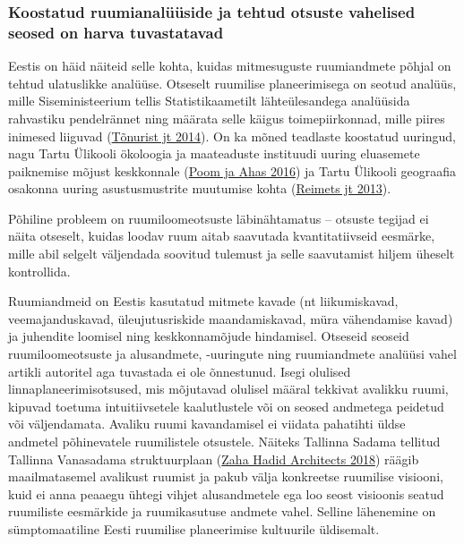 \documentclass[estonian,]{article}
\begin{document}
\hypertarget{koostatud-ruumianaluxfcuxfcside-ja-tehtud-otsuste-vahelised-seosed-on-harva-tuvastatavad}{%
\subsubsection*{Koostatud ruumianalüüside ja tehtud otsuste vahelised seosed on harva tuvastatavad}\label{koostatud-ruumianaluxfcuxfcside-ja-tehtud-otsuste-vahelised-seosed-on-harva-tuvastatavad}}

Eestis on häid näiteid selle kohta, kuidas mitmesuguste ruumiandmete põhjal on tehtud ulatuslikke analüüse. Otseselt ruumilise planeerimisega on seotud analüüs, mille Siseministeerium tellis Statistikaametilt lähteülesandega analüüsida rahvastiku pendelrännet ning määrata selle käigus toimepiirkonnad, mille piires inimesed liiguvad (\protect\hyperlink{Tuxf5nurist2014}{Tõnurist jt 2014}). On ka mõned teadlaste koostatud uuringud, nagu Tartu Ülikooli ökoloogia ja maateaduste instituudi uuring eluasemete paiknemise mõjust keskkonnale (\protect\hyperlink{Poom2016}{Poom ja Ahas 2016}) ja Tartu Ülikooli geograafia osakonna uuring asustusmustrite muutumise kohta (\protect\hyperlink{Reimets2013}{Reimets jt 2013}).

\begin{blockquote-left}
Põhiline probleem on ruumiloomeotsuste läbinähtamatus -- otsuste tegijad
ei näita otseselt, kuidas loodav ruum aitab saavutada kvantitatiivseid
eesmärke, mille abil selgelt väljendada soovitud tulemust ja selle
saavutamist hiljem üheselt kontrollida.
\end{blockquote-left}

Ruumiandmeid on Eestis kasutatud mitmete kavade (nt liikumiskavad, veemajanduskavad, üleujutusriskide maandamiskavad, müra vähendamise kavad) ja juhendite loomisel ning keskkonnamõjude hindamisel. Otseseid seoseid ruumiloomeotsuste ja alusandmete, -uuringute ning ruumiandmete analüüsi vahel artikli autoritel aga tuvastada ei ole õnnestunud. Isegi olulised linnaplaneerimisotsused, mis mõjutavad olulisel määral tekkivat avalikku ruumi, kipuvad toetuma intuitiivsetele kaalutlustele või on seosed andmetega peidetud või väljendamata. Avaliku ruumi kavandamisel ei viidata pahatihti üldse andmetel põhinevatele ruumilistele otsustele. Näiteks Tallinna Sadama tellitud Tallinna Vanasadama struktuurplaan (\protect\hyperlink{Zaha2018}{Zaha Hadid Architects 2018}) räägib maailmatasemel avalikust ruumist ja pakub välja konkreetse ruumilise visiooni, kuid ei anna peaaegu ühtegi vihjet alusandmetele ega loo seost visioonis seatud ruumiliste eesmärkide ja ruumikasutuse andmete vahel. Selline lähenemine on sümptomaatiline Eesti ruumilise planeerimise kultuurile üldisemalt.
\end{document}
